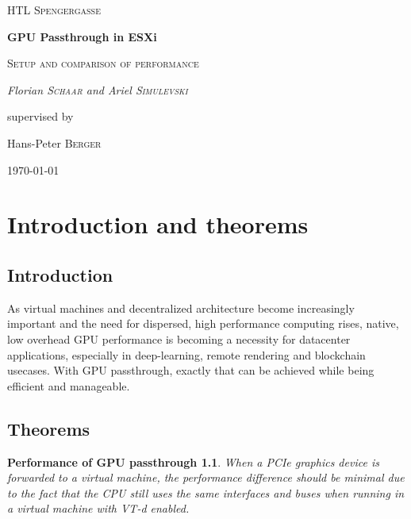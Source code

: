 \documentclass[12pt,a4paper]{report}
\newtheorem*{theorem1}{Performance of GPU passthrough}
\begin{document}
\begin{titlepage}
	\centering
	{\scshape\LARGE HTL Spengergasse \par}
	\vspace{1cm}
	{\huge\bfseries GPU Passthrough in ESXi \par}
	\vspace{1.5cm}
	{\scshape\Large Setup and comparison of performance \par}
	\vspace{2cm}
	{\Large\itshape Florian \textsc{Schaar} and Ariel \textsc{Simulevski}\par}
	\vfill
	supervised by\par
	Hans-Peter \textsc{Berger}

	\vfill

	{\large \today\par}
\end{titlepage}

\newpage

\tableofcontents

\newpage

\chapter{Introduction and theorems}

\section{Introduction}

As virtual machines and decentralized architecture become increasingly important and the need for dispersed, high performance computing rises, native, low overhead GPU performance is becoming a necessity for datacenter applications, especially in deep-learning, remote rendering and blockchain usecases. With GPU passthrough, exactly that can be achieved while being efficient and manageable.

\section{Theorems}

\begin{theorem1}
When a PCIe graphics device is forwarded to a virtual machine, the performance difference should be minimal due to the fact that the CPU still uses the same interfaces and buses when running in a virtual machine with VT-d enabled.
\end{theorem1}
\end{document}
